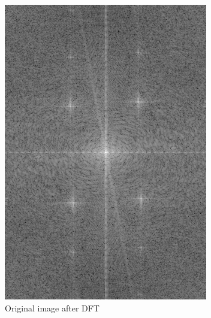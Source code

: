 \documentclass[
	12pt, %
]{style/fphw}
\begin{document}
\begin{figure}[H]
    \centering
    \begin{subfigure}[b]{.3\textwidth}
         \centering
         \includegraphics[width=\textwidth]{plots2/Q5_2_spectrum.png}
         \caption{Original image after DFT}
         \label{Q5_2_spectrum}
     \end{subfigure}
     \hfill
     \begin{subfigure}[b]{.3\textwidth}
         \centering

\end{subfigure}
\end{figure}
\end{document}
